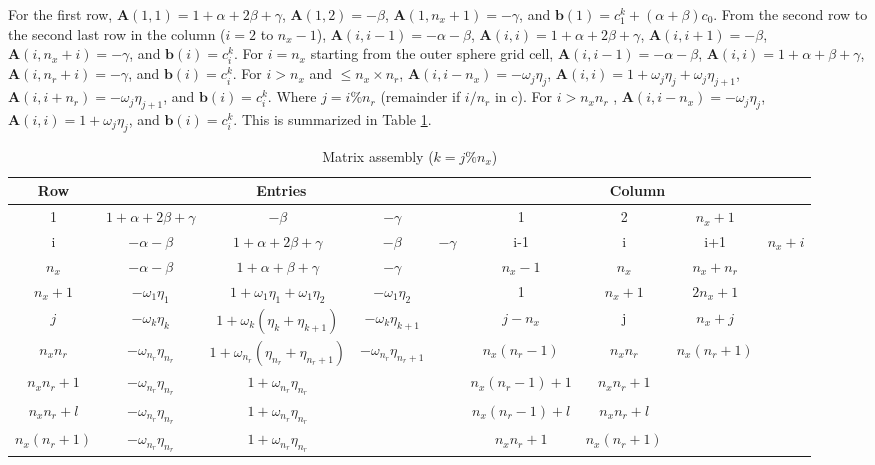 \documentclass{article}
\begin{document}
For the first row, $\mathbf{A}(1, 1) = 1 + \alpha + 2 \beta + \gamma$, $\mathbf{A}(1, 2) = -\beta$,  $\mathbf{A}(1, n_x+1) = -\gamma$, and $\mathbf{b}(1) = c_1^k + (\alpha+\beta)c_0$.   
From the second row to the second last row in the column ($i=2$ to $n_x-1$),  $\mathbf{A}(i, i-1) = -\alpha - \beta$, $\mathbf{A}(i, i) = 1 + \alpha + 2 \beta + \gamma$, $\mathbf{A}(i, i+1) = - \beta$,  $\mathbf{A}(i, n_x+i) = -\gamma$, and $\mathbf{b}(i) = c_i^k$. 
For $i = n_x$ starting from the outer sphere grid cell, $\mathbf{A}(i, i-1) = -\alpha - \beta$, $\mathbf{A}(i, i) = 1 + \alpha + \beta + \gamma$,  $\mathbf{A}(i, n_r+i) = -\gamma$, and $\mathbf{b}(i) = c_i^k$.
For $i >n_x$ and $\leq n_x\times n_r$, $\mathbf{A}(i, i-n_x) = -\omega_j \eta_j $, $\mathbf{A}(i, i) = 1 + \omega_j \eta_j + \omega_j \eta_{j+1} $,  $\mathbf{A}(i, i + n_r) = -\omega_j \eta_{j+1}$, and $\mathbf{b}(i) = c_i^k$. Where $j = i\%n_r$ (remainder if $i/n_r$ in c).
For $i >n_xn_r$ , $\mathbf{A}(i, i-n_x) = -\omega_j \eta_j $, $\mathbf{A}(i, i) = 1 + \omega_j \eta_j $,  and $\mathbf{b}(i) = c_i^k$. 
This is summarized in Table \ref{tab:assembly}.
\noindent
\begin{table}[H]
\label{tab:assembly}
\caption{Matrix assembly ($k=j\%n_x$)}
\begin{tabular}{ c | cccc | cccc }
\hline
Row & \multicolumn{4}{c|}{Entries} & \multicolumn{4}{c}{Column} \\
\hline
1 & $1+\alpha +2\beta+\gamma$      & $-\beta$ & $-\gamma$ & & 1 & 2 & $n_x+1$ & \\
i  & $-\alpha-\beta$ & $1+\alpha +2\beta+\gamma$      & $-\beta$ & $-\gamma$ & i-1 & i & i+1 & $n_x+i$ \\
$n_x$ & $-\alpha-\beta$ & $1+\alpha +\beta+\gamma$      & $-\gamma$ & & $n_x-1$ & $n_x$ & $n_x+n_r$ \\
\hline
$n_x+1$ & $-\omega_1\eta_1$ & $1+\omega_1\eta_1+\omega_1\eta_2$  & $-\omega_1\eta_2$    &   & 1 & $n_x+1$ & $2n_x+1$ &  \\
$j$ & $-\omega_k\eta_k$ & $1+\omega_k(\eta_k+\eta_{k+1})$  & $-\omega_k\eta_{k+1}$    &   & $j-n_x$ & j & $n_x+j$ &  \\
$n_xn_r$ & $-\omega_{n_r}\eta_{n_r}$ & $1+\omega_{n_r}(\eta_{n_r}+\eta_{n_r+1})$  & $-\omega_{n_r}\eta_{n_r+1}$    &   & $n_x(n_r-1)$ & $n_xn_r$ & $n_x(n_r+1)$ &  \\
\hline
$n_xn_r+1$ & $-\omega_{n_r}\eta_{n_r}$ & $1+\omega_{n_r}\eta_{n_r}$  &  &   & $n_x(n_r-1)+1$ & $n_xn_r+1$ & &  \\
$n_xn_r+l$ & $-\omega_{n_r}\eta_{n_r}$ & $1+\omega_{n_r}\eta_{n_r}$  &  &   & $n_x(n_r-1)+l$ & $n_xn_r+l$ & &  \\
$n_x(n_r+1)$ & $-\omega_{n_r}\eta_{n_r}$ & $1+\omega_{n_r}\eta_{n_r}$  &  &   & $n_xn_r+1$ & $n_x(n_r+1)$ &  &  \\
\hline
\end{tabular}
\end{table}
\end{document}
